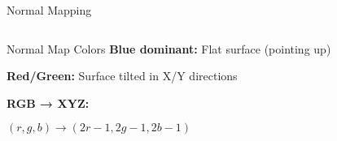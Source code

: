 \begin{frame}{Normal Mapping}
\begin{columns}
\begin{column}{0.5\textwidth}

      \vspace{0.3cm}
      \begin{raybox}{Normal Map Colors}
        \footnotesize
        \textbf{Blue dominant:} Flat surface (pointing up)

        \textbf{Red/Green:} Surface tilted in X/Y directions

        \textbf{RGB → XYZ:}

        $(r,g,b) \rightarrow (2r-1, 2g-1, 2b-1)$
      \end{raybox}
    \end{column}
  \end{columns}
\end{frame}

